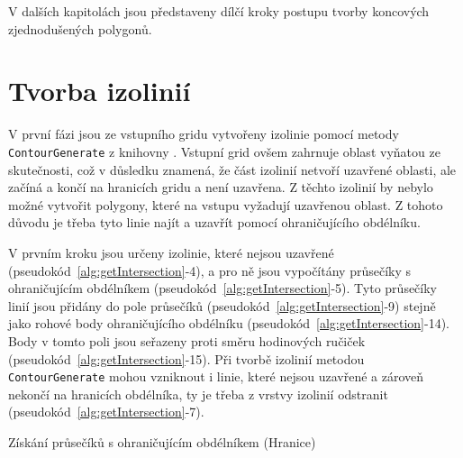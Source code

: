 V dalších kapitolách jsou představeny dílčí kroky postupu tvorby koncových zjednodušených polygonů.

\section{Tvorba izolinií}

V první fázi jsou ze vstupního gridu vytvořeny izolinie pomocí metody \texttt{ContourGenerate} z knihovny . Vstupní grid ovšem zahrnuje oblast vyňatou ze skutečnosti, což v důsledku znamená, že část izolinií netvoří uzavřené oblasti, ale začíná a končí na hranicích gridu a není uzavřena. Z těchto izolinií by nebylo možné vytvořit polygony, které na vstupu vyžadují uzavřenou oblast. Z tohoto důvodu je třeba tyto linie najít a uzavřít pomocí ohraničujícího obdélníku. 

V prvním kroku jsou určeny izolinie, které nejsou uzavřené (pseudokód~\ref{alg:getIntersection}-4), a pro ně jsou vypočítány průsečíky s ohraničujícím obdélníkem (pseudokód~\ref{alg:getIntersection}-5). Tyto průsečíky linií jsou přidány do pole průsečíků (pseudokód~\ref{alg:getIntersection}-9) stejně jako rohové body ohraničujícího obdélníku (pseudokód~\ref{alg:getIntersection}-14). Body v tomto poli jsou seřazeny proti směru hodinových ručiček (pseudokód~\ref{alg:getIntersection}-15). Při tvorbě izolinií metodou \texttt{ContourGenerate} mohou vzniknout i linie, které nejsou uzavřené a zároveň nekončí na hranicích obdélníka, ty je třeba z vrstvy izolinií odstranit (pseudokód~\ref{alg:getIntersection}-7).

\begin{algorithm}
\caption{Získání průsečíků s ohraničujícím obdélníkem (Hranice)}
\label{alg:getIntersection}
    \begin{algorithmic}[1] 
			\ELSE
			\ENDIF	
		\ENDIF
	\ENDWHILE
    \end{algorithmic}
\end{algorithm}

